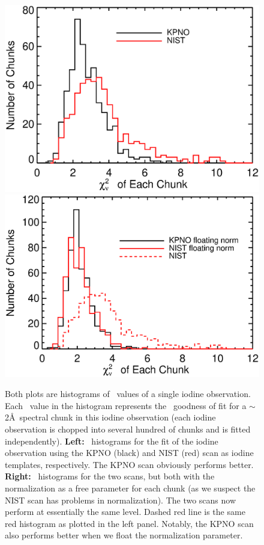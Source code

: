 \begin{figure}[!th]
\includegraphics[angle=0.,scale=0.38]{het/hetfts_oldVSnew_chisq.eps}
\includegraphics[angle=0.,scale=0.38]{het/hetfts_oldVSnew_chisq_dc.eps}
\caption{Both plots are histograms of \chisq\ values of a single
  iodine observation. Each \chisq\ value in the histogram represents
  the \chisq\ goodness of fit for a $\sim$2\AA\ spectral chunk in this
  iodine observation (each iodine observation is chopped into several
  hundred of chunks and is fitted independently).
%
  \textbf{Left:} \chisq\ histograms for the fit of the iodine
  observation using the KPNO (black) and NIST (red) scan as iodine
  templates, respectively. The KPNO scan obviously performs better.
%
  \textbf{Right:} \chisq\ histograms for the two scans, but both with
  the normalization as a free parameter for each chunk (as we suspect
  the NIST scan has problems in normalization). The two scans now
  perform at essentially the same level. Dashed red line is the same
  red histogram as plotted in the left panel. Notably, the KPNO scan
  also performs better when we float the normalization parameter.
  \label{fig:chisq_old_new}}
\end{figure}


